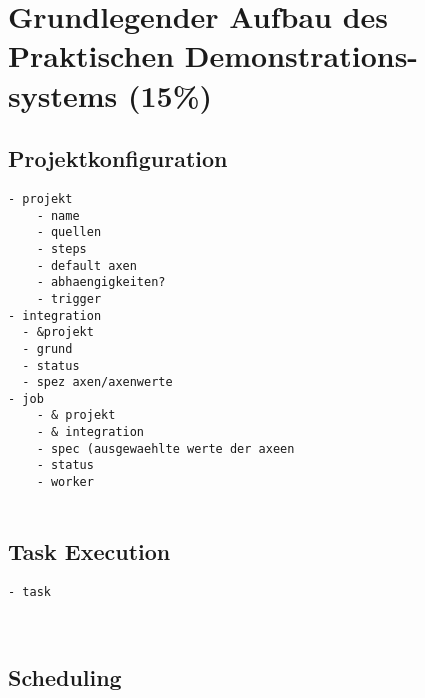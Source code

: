 \chapter{Grundlegender Aufbau des Praktischen Demonstrations-systems (15\%)}


\section{Projektkonfiguration}


\begin{verbatim}
- projekt
    - name
    - quellen
    - steps
    - default axen
    - abhaengigkeiten?
    - trigger
- integration
  - &projekt
  - grund
  - status
  - spez axen/axenwerte
- job
    - & projekt
    - & integration
    - spec (ausgewaehlte werte der axeen
    - status
    - worker


\end{verbatim}



\section{Task Execution}

\begin{verbatim}
- task
  


\end{verbatim}


\section{Scheduling}
